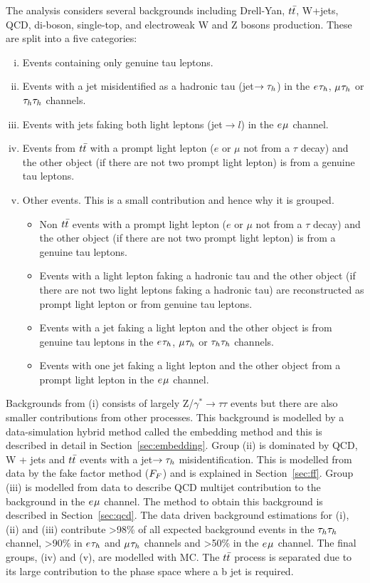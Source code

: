 The analysis considers several backgrounds including Drell-Yan, $t\bar{t}$, W+jets, QCD, di-boson, single-top, and electroweak W and Z bosons production.
These are split into a five categories:
\begin{enumerate}[i)]
  \item Events containing only genuine tau leptons.
  \item Events with a jet misidentified as a hadronic tau (jet$\rightarrow \tau_{h}$) in the $e_{}\tau_{h}$, $\mu_{}\tau_{h}$ or $\tau_{h}\tau_{h}$ channels.
  \item Events with jets faking both light leptons (jet$\rightarrow l$) in the $e_{}\mu_{}$ channel.
  \item Events from $t\bar{t}$ with a prompt light lepton ($e$ or $\mu$ not from a $\tau$ decay) and the other object (if there are not two prompt light lepton) is from a genuine tau leptons.
  \item Other events. This is a small contribution and hence why it is grouped.
  \begin{itemize}
    \item Non $t\bar{t}$ events with a prompt light lepton ($e$ or $\mu$ not from a $\tau$ decay) and the other object (if there are not two prompt light lepton) is from a genuine tau leptons.
    \item Events with a light lepton faking a hadronic tau and the other object (if there are not two light leptons faking a hadronic tau) are reconstructed as prompt light lepton or from genuine tau leptons. 
    \item Events with a jet faking a light lepton and the other object is from genuine tau leptons in the $e_{}\tau_{h}$, $\mu_{}\tau_{h}$ or $\tau_{h}\tau_{h}$ channels.
    \item Events with one jet faking a light lepton and the other object from a prompt light lepton in the $e_{}\mu_{}$ channel.
   \end{itemize}
\end{enumerate}

Backgrounds from (i) consists of largely Z/$\gamma^* \rightarrow \tau\tau$ events but there are also smaller contributions from other processes. 
This background is modelled by a data-simulation hybrid method called the embedding method and this is described in detail in Section~\ref{sec:embedding}.
Group (ii) is dominated by QCD, W + jets and $t\bar{t}$ events with a jet$\rightarrow \tau_{h}$ misidentification.
This is modelled from data by the fake factor method ($F_{F}$) and is explained in Section~\ref{sec:ff}.
Group (iii) is modelled from data to describe QCD multijet contribution to the background in the $e_{}\mu_{}$ channel.
The method to obtain this background is described in Section~\ref{sec:qcd}.
The data driven background estimations for (i), (ii) and (iii) contribute >98\% of all expected background events in the $\tau_{h}\tau_{h}$ channel, >90\% in $e_{}\tau_{h}$ and $\mu_{}\tau_{h}$ channels and >50\% in the $e_{}\mu_{}$ channel.
The final groups, (iv) and (v), are modelled with MC.
The $t\bar{t}$ process is separated due to its large contribution to the phase space where a b jet is required. \\

